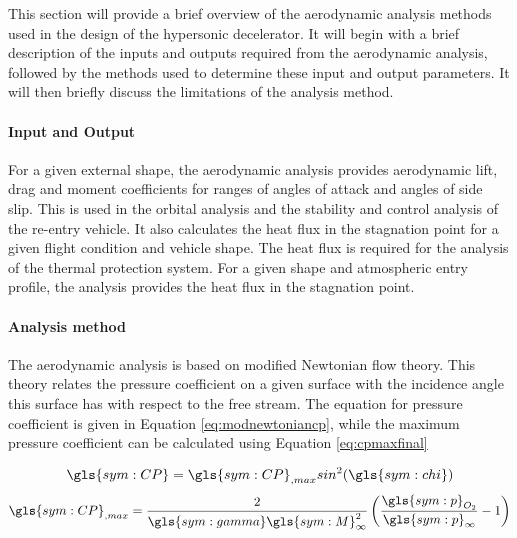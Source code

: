 This section will provide a brief overview of the aerodynamic analysis methods used in the design of the hypersonic decelerator. It will begin with a brief description of the inputs and outputs required from the aerodynamic analysis, followed by the methods used to determine these input and output parameters. It will then briefly discuss the limitations of the analysis method. 

\paragraph{Input and Output}
For a given external shape, the aerodynamic analysis provides aerodynamic lift, drag and moment coefficients for ranges of angles of attack and angles of side slip. This is used in the orbital analysis and the stability and control analysis of the re-entry vehicle. It also calculates the heat flux in the stagnation point for a given flight condition and vehicle shape. The heat flux is required for the analysis of the thermal protection system. For a given shape and atmospheric entry profile, the analysis provides the heat flux in the stagnation point.

\paragraph{Analysis method}
The aerodynamic analysis is based on modified Newtonian flow theory. This theory relates the pressure coefficient on a given surface with the incidence angle this surface has with respect to the free stream. The equation for pressure coefficient is given in Equation \ref{eq:modnewtoniancp}, while the maximum pressure coefficient can be calculated using Equation \ref{eq:cpmaxfinal}

\begin{multicols}{2}
	\begin{equation}
		\gls{sym:CP}=\gls{sym:CP}_{,max}sin^{2}(\gls{sym:chi})
		\label{eq:modnewtoniancp}
	\end{equation} \break
	\begin{equation}
		\gls{sym:CP}_{,max} = \frac{2}{\gls{sym:gamma} \gls{sym:M}_{\infty}^{2}}\left(\frac{\gls{sym:p}_{O_{2}}}{\gls{sym:p}_{\infty}}-1\right)
		\label{eq:cpmaxfinal}
	\end{equation}
\end{multicols}

